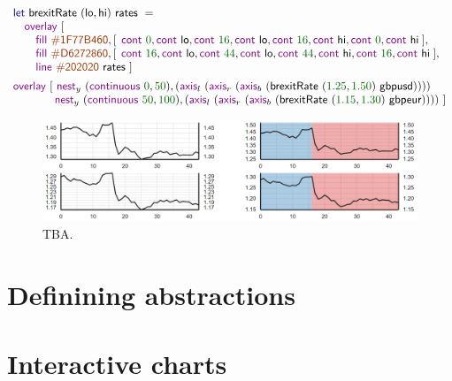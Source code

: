 \documentclass{jfp}
\newcommand{\num}[1]{\textcolor{numclr}{#1}}
\newcommand{\strf}[1]{\textnormal{\textcolor{strclr}{\sffamily #1}}}
\newcommand{\ident}[1]{\textnormal{\textcolor{idclr}{\sffamily #1}}}
\newcommand{\kvd}[1]{\textnormal{\textcolor{kvdclr}{\sffamily #1}}}
\newcommand{\fkvd}[1]{\textnormal{\textcolor{fkvdclr}{\sffamily #1}}}
\begin{document}
\begin{equation*}
\begin{array}{l}
\fkvd{let}~\ident{brexitRate}~(\ident{lo}, \ident{hi})~\ident{rates}~=\\
\quad \kvd{overlay}~[\\
\qquad \kvd{fill}~\strf{\#1F77B460}, [\;\,\kvd{cont}~\num{0}, \kvd{cont}~\ident{lo}, \kvd{cont}~\num{16}, \kvd{cont}~\ident{lo}, \kvd{cont}~\num{16}, \kvd{cont}~\ident{hi}, \kvd{cont}~\num{0}, \kvd{cont}~\ident{hi}\;],\\
\qquad \kvd{fill}~\strf{\#D6272860}, [\;\,\kvd{cont}~\num{16}, \kvd{cont}~\ident{lo}, \kvd{cont}~\num{44}, \kvd{cont}~\ident{lo}, \kvd{cont}~\num{44}, \kvd{cont}~\ident{hi}, \kvd{cont}~\num{16}, \kvd{cont}~\ident{hi}\;],\\
\qquad \kvd{line}~\strf{\#202020}~\ident{rates}~]\\[0.5em]
\kvd{overlay}~[~
\kvd{nest}_y~(\kvd{continuous}~\num{0},\num{50}), (\kvd{axis}_l~(\kvd{axis}_r~(\kvd{axis}_b~(\ident{brexitRate}~(\num{1.25}, \num{1.50})~\ident{gbpusd}))))\\
\hspace{3.68em} \kvd{nest}_y~(\kvd{continuous}~\num{50},\num{100}), (\kvd{axis}_l~(\kvd{axis}_r~(\kvd{axis}_b~(\ident{brexitRate}~(\num{1.15}, \num{1.30})~\ident{gbpeur}))))~]\\
\end{array}
\end{equation*}

\begin{figure}
  \includegraphics[scale=0.57]{figures/lines}
  \vspace{0.25em}
  \caption{TBA.}
  \label{fig:lines}
\end{figure}


\newpage

\section{Definining abstractions}
\label{sec:abstractions}

\section{Interactive charts}
\end{document}
